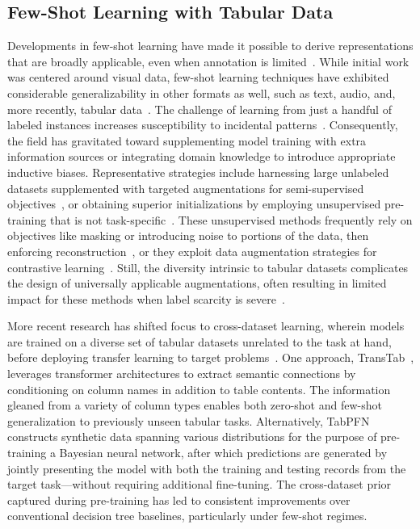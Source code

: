 \subsection{Few-Shot Learning with Tabular Data} Developments in few-shot learning have made it possible to derive representations that are broadly applicable, even when annotation is limited~\cite{chen2018closer}. While initial work was centered around visual data, few-shot learning techniques have exhibited considerable generalizability in other formats as well, such as text, audio, and, more recently, tabular data~\cite{majumder2022few,nam2023stunt,schick2021exploiting}. The challenge of learning from just a handful of labeled instances increases susceptibility to incidental patterns~\cite{bartlett2021deep}. Consequently, the field has gravitated toward supplementing model training with extra information sources or integrating domain knowledge to introduce appropriate inductive biases. Representative strategies include harnessing large unlabeled datasets supplemented with targeted augmentations for semi-supervised objectives~\cite{ucar2021subtab,yoon2020vime}, or obtaining superior initializations by employing unsupervised pre-training that is not task-specific~\cite{somepalli2021saint}. These unsupervised methods frequently rely on objectives like masking or introducing noise to portions of the data, then enforcing reconstruction~\cite{arik2021tabnet,majmundar2022met}, or they exploit data augmentation strategies for contrastive learning~\cite{bahri2022scarf,chen2020simple}. Still, the diversity intrinsic to tabular datasets complicates the design of universally applicable augmentations, often resulting in limited impact for these methods when label scarcity is severe~\cite{nam2023stunt}. 

More recent research has shifted focus to cross-dataset learning, wherein models are trained on a diverse set of tabular datasets unrelated to the task at hand, before deploying transfer learning to target problems~\cite{zhang2023generative,levin2022transfer,zhu2023xtab}. One approach, TransTab~\cite{wang2022transtab}, leverages transformer architectures to extract semantic connections by conditioning on column names in addition to table contents. The information gleaned from a variety of column types enables both zero-shot and few-shot generalization to previously unseen tabular tasks. Alternatively, TabPFN~\cite{hollmann2022tabpfn} constructs synthetic data spanning various distributions for the purpose of pre-training a Bayesian neural network, after which predictions are generated by jointly presenting the model with both the training and testing records from the target task—without requiring additional fine-tuning. The cross-dataset prior captured during pre-training has led to consistent improvements over conventional decision tree baselines, particularly under few-shot regimes.

